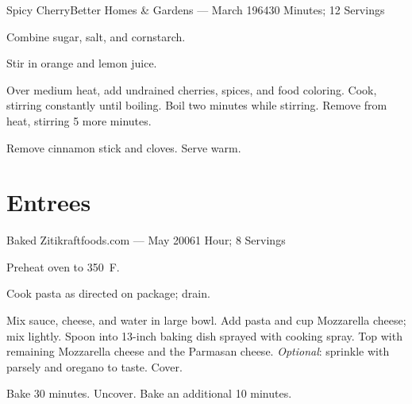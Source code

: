 \documentclass{article}
\begin{document}
\begin{recipe}{Spicy Cherry}{Better Homes \& Gardens --- March 1964}{30 Minutes; 12 Servings}

   Combine sugar, salt, and cornstarch.

   Stir in orange and lemon juice.

   Over medium heat, add undrained cherries, spices, and food coloring.  Cook,
   stirring constantly until boiling.  Boil two minutes while stirring.  Remove
   from heat, stirring 5 more minutes.

   \freeform
   Remove cinnamon stick and cloves.  Serve warm.

\end{recipe}

\section{Entrees}

\begin{recipe}{Baked Ziti}{kraftfoods.com --- May 2006}{1 Hour; 8 Servings}

   \newstep
   Preheat oven to 350\ \0F.

   Cook pasta as directed on package; drain.

   Mix sauce, cheese, and water in large bowl.  Add pasta and  cup
   Mozzarella cheese; mix lightly.  Spoon into 13-inch baking dish sprayed
   with cooking spray.  Top with remaining Mozzarella cheese and the Parmasan
   cheese.  \emph{Optional}: sprinkle with parsely and oregano to taste.  Cover.

   \newstep
   Bake 30 minutes. Uncover.  Bake an additional 10 minutes.

\end{recipe}
\end{document}

